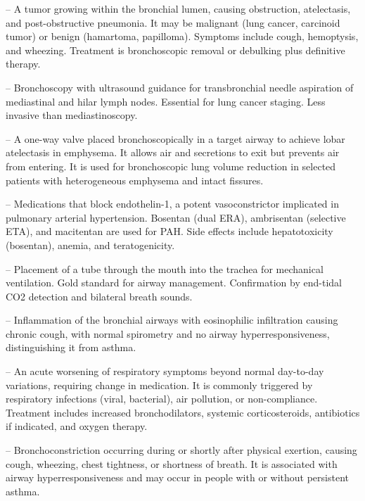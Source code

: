 -- A tumor growing within the bronchial lumen, causing obstruction, atelectasis, and post-obstructive pneumonia. It may be malignant (lung cancer, carcinoid tumor) or benign (hamartoma, papilloma). Symptoms include cough, hemoptysis, and wheezing. Treatment is bronchoscopic removal or debulking plus definitive therapy.

-- Bronchoscopy with ultrasound guidance for transbronchial needle aspiration of mediastinal and hilar lymph nodes. Essential for lung cancer staging. Less invasive than mediastinoscopy.

-- A one-way valve placed bronchoscopically in a target airway to achieve lobar atelectasis in emphysema. It allows air and secretions to exit but prevents air from entering. It is used for bronchoscopic lung volume reduction in selected patients with heterogeneous emphysema and intact fissures.

-- Medications that block endothelin-1, a potent vasoconstrictor implicated in pulmonary arterial hypertension. Bosentan (dual ERA), ambrisentan (selective ETA), and macitentan are used for PAH. Side effects include hepatotoxicity (bosentan), anemia, and teratogenicity.

-- Placement of a tube through the mouth into the trachea for mechanical ventilation. Gold standard for airway management. Confirmation by end-tidal CO2 detection and bilateral breath sounds.

-- Inflammation of the bronchial airways with eosinophilic infiltration causing chronic cough, with normal spirometry and no airway hyperresponsiveness, distinguishing it from asthma.

-- An acute worsening of respiratory symptoms beyond normal day-to-day variations, requiring change in medication. It is commonly triggered by respiratory infections (viral, bacterial), air pollution, or non-compliance. Treatment includes increased bronchodilators, systemic corticosteroids, antibiotics if indicated, and oxygen therapy.

-- Bronchoconstriction occurring during or shortly after physical exertion, causing cough, wheezing, chest tightness, or shortness of breath. It is associated with airway hyperresponsiveness and may occur in people with or without persistent asthma.

